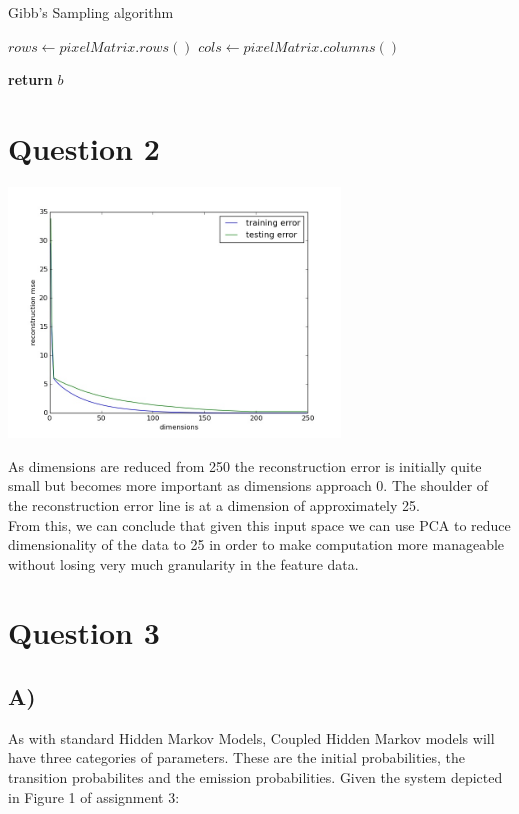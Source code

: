 \documentclass{report}
\begin{document}
\begin{algorithm}
  \caption{Gibb’s Sampling algorithm}
  \begin{algorithmic}[1]
      \State $rows\gets pixelMatrix.rows()$
      \State $cols\gets pixelMatrix.columns()$



          \EndFor
        \EndFor
      \EndFor
      \State \textbf{return} $b$
    \EndProcedure
  \end{algorithmic}
\end{algorithm}

\section*{Question 2}
\begin{center}
\includegraphics[width=250pt, keepaspectratio=true]{reconstruction_error.jpg}\\
\end{center}
As dimensions are reduced from 250 the reconstruction error is initially quite
small but becomes more important as dimensions approach 0. The
shoulder of the reconstruction error line is at a dimension of approximately 25.\\

From this, we can conclude that given this input space we can use PCA to
reduce dimensionality of the data to 25 in order to make computation more manageable
without losing very much granularity in the feature data.
\section*{Question 3}
\subsection*{A)}
As with standard Hidden Markov Models, Coupled Hidden Markov models will
have three categories of parameters. These are the initial probabilities, the
transition probabilites and the emission probabilities. Given the system
depicted in Figure 1 of assignment 3:\\
\end{document}
